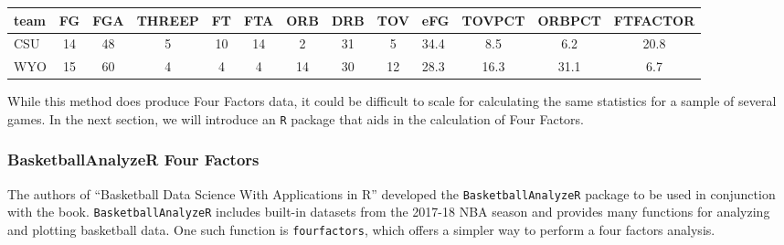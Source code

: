 \documentclass[
  11pt,
]{book}
\newenvironment{Shaded}{\begin{snugshade}}{\end{snugshade}}
\newcommand{\CommentTok}[1]{\textcolor[rgb]{0.56,0.35,0.01}{\textit{#1}}}
\newcommand{\DecValTok}[1]{\textcolor[rgb]{0.00,0.00,0.81}{#1}}
\newcommand{\FunctionTok}[1]{\textcolor[rgb]{0.00,0.00,0.00}{#1}}
\newcommand{\NormalTok}[1]{#1}
\newcommand{\OtherTok}[1]{\textcolor[rgb]{0.56,0.35,0.01}{#1}}
\newcommand{\SpecialCharTok}[1]{\textcolor[rgb]{0.00,0.00,0.00}{#1}}
\newcommand{\StringTok}[1]{\textcolor[rgb]{0.31,0.60,0.02}{#1}}
\theoremstyle{definition}
\theoremstyle{definition}
\theoremstyle{definition}
\theoremstyle{definition}
\theoremstyle{remark}
\begin{document}
\begin{table}[H]
\centering
\begin{tabular}{l|c|c|c|c|c|c|c|c|l|c|c|c}
\hline
team & FG & FGA & THREEP & FT & FTA & ORB & DRB & TOV & eFG & TOVPCT & ORBPCT & FTFACTOR\\
\hline
CSU & 14 & 48 & 5 & 10 & 14 & 2 & 31 & 5 & 34.4 & 8.5 & 6.2 & 20.8\\
\hline
WYO & 15 & 60 & 4 & 4 & 4 & 14 & 30 & 12 & 28.3 & 16.3 & 31.1 & 6.7\\
\hline
\end{tabular}
\end{table}

While this method does produce Four Factors data, it could be difficult to scale for calculating the same statistics for a sample of several games. In the next section, we will introduce an \texttt{R} package that aids in the calculation of Four Factors.

\hypertarget{basketballanalyzer-four-factors}{%
\subsubsection{BasketballAnalyzeR Four Factors}\label{basketballanalyzer-four-factors}}

The authors of ``Basketball Data Science With Applications in R'' developed the \texttt{BasketballAnalyzeR} package to be used in conjunction with the book. \texttt{BasketballAnalyzeR} includes built-in datasets from the 2017-18 NBA season and provides many functions for analyzing and plotting basketball data. One such function is \texttt{fourfactors}, which offers a simpler way to perform a four factors analysis.

\begin{Shaded}
\end{Shaded}
\end{document}
